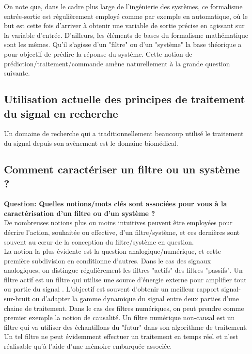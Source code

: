 \documentclass[11pt,a4paper]{article}
\begin{document}
\vspace{0.5cm}

On note que, dans le cadre plus large de l'ingénierie des systèmes, ce formalisme entrée-sortie est régulièrement employé comme par exemple en automatique, où le but est cette fois d'arriver à obtenir une variable de sortie précise en agissant sur la variable d'entrée. D'ailleurs, les éléments de bases du formalisme mathématique sont les mêmes. Qu'il s'agisse d'un "filtre" ou d'un "système" la base théorique a pour objectif de prédire la réponse du système. Cette notion de prédiction/traitement/commande amène naturellement à la grande question suivante.

\subsection{Utilisation actuelle des principes de traitement du signal en recherche}
Un domaine de recherche qui a traditionnellement beaucoup utilisé le traitement du signal depuis son avènement est le domaine biomédical.

\label{**illustrer} 

\subsection{Comment caractériser un filtre ou un système ?}  
\textbf{Question: Quelles notions/mots clés sont associées pour vous à la caractérisation d'un filtre ou d'un système ?}\\

De nombreuses notions plus ou moins intuitives peuvent être employées pour décrire l'action, souhaitée ou effective, d'un filtre/système, et ces dernières sont souvent au cœur de la conception du filtre/système en question.\\

La notion la plus évidente est la question analogique/numérique, et cette première subdivision en conditionne d'autres. Dans le cas des signaux analogiques, on distingue régulièrement les filtres "actifs" des filtres "passifs". Un filtre actif est un filtre qui utilise une source d'énergie externe pour amplifier tout ou partie du signal . L'objectif est souvent d'obtenir un meilleur rapport signal-sur-bruit ou d'adapter la gamme dynamique du signal entre deux parties d'une chaine de traitement. Dans le cas des filtres numériques, on peut prendre comme premier exemple la notion de causalité. Un filtre numérique non-causal est un filtre qui va utiliser des échantillons du "futur" dans son algorithme de traitement. Un tel filtre ne peut évidemment effectuer un traitement en temps réel et n'est réalisable qu'à l'aide d'une mémoire embarquée associée.\\
\end{document}
